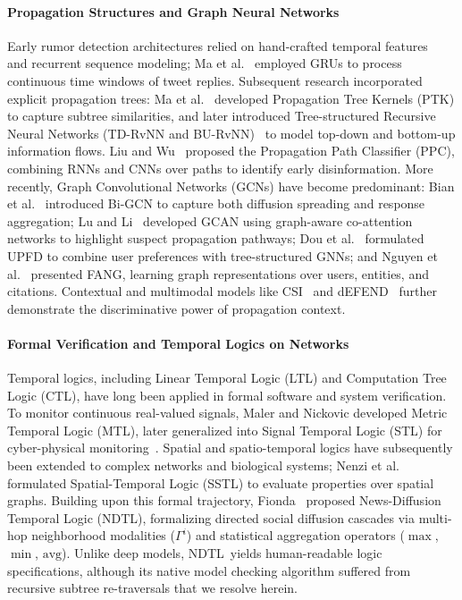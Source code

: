 \documentclass[10pt,twocolumn,a4paper]{article}
\newcommand{\NDTL}{\textsc{NDTL}}
\begin{document}
\paragraph{Propagation Structures and Graph Neural Networks}
Early rumor detection architectures relied on hand-crafted temporal features~\cite{kwon2013rumor} and recurrent sequence modeling; Ma et al.~\cite{ma2016} employed GRUs to process continuous time windows of tweet replies. Subsequent research incorporated explicit propagation trees: Ma et al.~\cite{ma2017} developed Propagation Tree Kernels (PTK) to capture subtree similarities, and later introduced Tree-structured Recursive Neural Networks (TD-RvNN and BU-RvNN)~\cite{ma2018rvnn} to model top-down and bottom-up information flows. Liu and Wu~\cite{liu2018ppc} proposed the Propagation Path Classifier (PPC), combining RNNs and CNNs over paths to identify early disinformation. More recently, Graph Convolutional Networks (GCNs) have become predominant: Bian et al.~\cite{bian2020} introduced Bi-GCN to capture both diffusion spreading and response aggregation; Lu and Li~\cite{lu2020gcan} developed GCAN using graph-aware co-attention networks to highlight suspect propagation pathways; Dou et al.~\cite{dou2021upfd} formulated UPFD to combine user preferences with tree-structured GNNs; and Nguyen et al.~\cite{nguyen2020fang} presented FANG, learning graph representations over users, entities, and citations. Contextual and multimodal models like CSI~\cite{ruchansky2017csi} and dEFEND~\cite{shu2019defend} further demonstrate the discriminative power of propagation context.

\paragraph{Formal Verification and Temporal Logics on Networks}
Temporal logics, including Linear Temporal Logic (LTL) and Computation Tree Logic (CTL), have long been applied in formal software and system verification. To monitor continuous real-valued signals, Maler and Nickovic developed Metric Temporal Logic (MTL), later generalized into Signal Temporal Logic (STL) for cyber-physical monitoring~\cite{bartocci2018stl}. Spatial and spatio-temporal logics have subsequently been extended to complex networks and biological systems; Nenzi et al.~\cite{nenzi2015sstl} formulated Spatial-Temporal Logic (SSTL) to evaluate properties over spatial graphs. Building upon this formal trajectory, Fionda~\cite{fionda2025} proposed News-Diffusion Temporal Logic (\NDTL), formalizing directed social diffusion cascades via multi-hop neighborhood modalities ($\Gamma^i$) and statistical aggregation operators ($\max$, $\min$, $\mathrm{avg}$). Unlike deep models, \NDTL\ yields human-readable logic specifications, although its native model checking algorithm suffered from recursive subtree re-traversals that we resolve herein.
\end{document}
